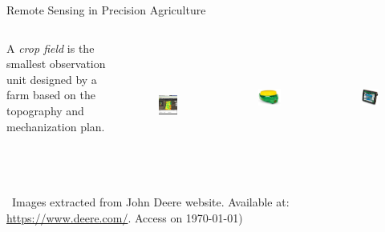 \documentclass[xcolor=table]{beamer}
\begin{document}
\begin{frame}{ \normalsize Remote Sensing in Precision Agriculture}
		
	\begin{columns}
		    \begin{tcolorbox}[colback=yellow!5,colframe=yellow!75!black]
		    A \textit{crop field} is the smallest observation unit designed by a farm based on the topography and mechanization plan. 
	        \end{tcolorbox}
	        
    		\begin{figure}[htb]
    			\centering
    			\includegraphics[height=3.5cm]{figs/fieldanalyzer.png}
    			\label{fig:textFieldAnalyzer}
    		\end{figure}


    		\begin{figure}[htb]
    			\centering
    			\includegraphics[height=3cm]{figs/gps.png}
    			\label{fig:gps}
    		\end{figure}
    		
    		\begin{figure}[htb]
    			\centering
    			\includegraphics[height=3cm]{figs/display.png}
    			\label{fig:display}
    		\end{figure}

	\end{columns}
	~\flushright \tiny {Images extracted from John Deere website. Available at: \url{https://www.deere.com/}. Access on \today})
	
\end{frame}
\end{document}
